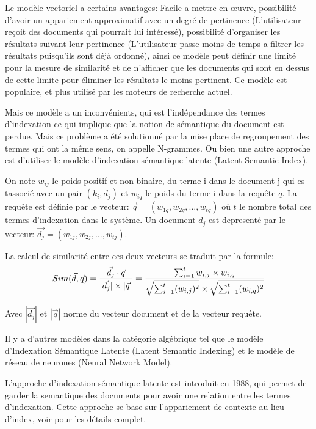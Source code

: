 Le modèle vectoriel a certains avantages: Facile a mettre en œuvre, possibilité d'avoir un appariement approximatif avec un degré de pertinence (L'utilisateur reçoit des documents qui pourrait lui intéressé), possibilité d'organiser les résultats suivant leur pertinence (L'utilisateur passe moins de temps a filtrer les résultats puisqu'ils sont déjà ordonné), ainsi ce modèle peut définir une limité pour la mesure de similarité et de n'afficher que les documents qui sont en dessus de cette limite pour éliminer les résultats le moins pertinent. Ce modèle est populaire, et plus utilisé par les moteurs de recherche actuel. \citep*{approche-semantique, modern-ir, soulier2014:def-evaluation-modele}

Mais ce modèle a un inconvénients, qui est l’indépendance des termes d'indexation ce qui implique que la notion de sémantique du document est perdue. Mais ce problème a été solutionné par la mise place de regroupement des termes qui ont la même sens, on appelle N-grammes. Ou bien une autre approche est d'utiliser le modèle d’indexation sémantique latente (Latent Semantic Index).

\begin{definition}
    On note $w_{ij}$ le poids positif et non binaire, du terme i dans le document j qui es tassocié avec un pair $(k_{i}, d_{j})$ et $w_{iq}$ le poids du terme i dans la requête $q$. La requête est définie par le vecteur: $ \vec{q} = (w_{1q}, w_{2q}, \dots, w_{tq}) $ où $t$ le nombre total des termes d'indexation dans le système. Un document $d_{j}$ est depresenté par le vecteur: $ \vec{d_{j}} = (w_{1j}, w_{2j}, \dots, w_{tj}) $.

    La calcul de similarité entre ces deux vecteurs se traduit par la formule:
    \[
        Sim(\vec{d}, \vec{q}) = \frac{\vec{d_{j}} \cdot \vec{q}}{ |\vec{d_{j}}| \times |\vec{q}| } \\
        = \frac{\sum_{i=1}^{t} w_{i,j} \times w_{i,q}}{\sqrt{\sum_{i=1}^{t} (w_{i,j})^2} \times \sqrt{\sum_{i=1}^{t} (w_{i,q})^2}}
    \]

    Avec $ |\vec{d_{j}}| $ et $ |\vec{q}| $ norme du vecteur document et de la vecteur requête.
\end{definition}

Il y a d'autres modèles dans la catégorie algébrique tel que le modèle d'Indexation Sémantique Latente (Latent Semantic Indexing) et le modèle de réseau de neurones (Neural Network Model).

L'approche d'indexation sémantique latente est introduit en 1988, qui permet de garder la semantique des documents pour avoir une relation entre les termes d'indexation. Cette approche se base sur l’appariement de contexte au lieu d'index, voir  \citep{modern-ir} pour les détails complet.

